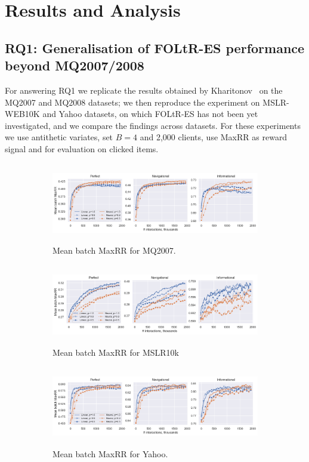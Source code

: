 \section{Results and Analysis}

\subsection{RQ1: Generalisation of FOLtR-ES performance beyond MQ2007/2008}
For answering RQ1 we replicate the results obtained by Kharitonov~\cite{kharitonov2019federated} on the MQ2007 and MQ2008 datasets; we then reproduce the experiment on MSLR-WEB10K and Yahoo datasets, on which FOLtR-ES has not been yet investigated, and we compare the findings across datasets. For these experiments we use antithetic variates, set $B = 4$ and 2,000 clients, use MaxRR as reward signal and for evaluation on clicked items. 

\begin{figure}[t]
	\centering
	\begin{subfigure}{1\textwidth}
		\includegraphics[width=13cm, height=3.5cm]{images/RQ1/mq2007_foltr_c2000_ps.png}
		\caption{Mean batch MaxRR for MQ2007.}
		\label{fig:mq2007-rq1}
	\end{subfigure}
	\begin{subfigure}{1\textwidth}
		\includegraphics[width=13cm, height=3.5cm]{images/RQ1/mslr10k_foltr_c2000_ps.png}
		\caption{Mean batch MaxRR for MSLR10k}
		\label{fig:mslr10k-rq1}
	\end{subfigure}
	\begin{subfigure}{1\textwidth}
		\includegraphics[width=13cm, height=3.5cm]{images/RQ1/yahoo_foltr_c2000_ps.png}
		\caption{Mean batch MaxRR for Yahoo.}
		\label{fig:yahoo-rq1}
	\end{subfigure}
	\caption{{\color{red}{Results for RQ1: performance of FOLtR-ES across datasets under three different click models (averaged across all dataset splits).}} \label{fig:RQ1}}
\end{figure}

